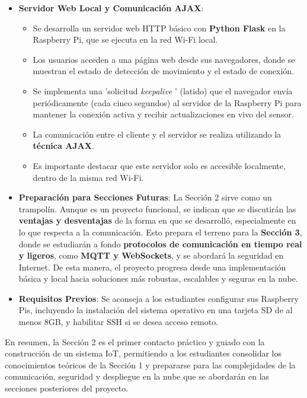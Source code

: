 \documentclass{report}
\begin{document}
\begin{itemize}
    \item \textbf{Servidor Web Local y Comunicación AJAX}:
    \begin{itemize}
        \item Se desarrolla un servidor web HTTP básico con \textbf{Python Flask} en la Raspberry Pi, que se ejecuta en la red Wi-Fi local.
        \item Los usuarios acceden a una página web desde sus navegadores, donde se muestran el estado de detección de movimiento y el estado de conexión.
        \item Se implementa una  'solicitud \textit{keepalive} ' (latido) que el navegador envía periódicamente (cada cinco segundos) al servidor 
        de la Raspberry Pi para mantener la conexión activa y recibir actualizaciones en vivo del sensor.
        \item La comunicación entre el cliente y el servidor se realiza utilizando la \textbf{técnica AJAX}.
        \item Es importante destacar que este servidor solo es accesible localmente, dentro de la misma red Wi-Fi.
    \end{itemize}

    \item \textbf{Preparación para Secciones Futuras}: La Sección 2 sirve como un trampolín. Aunque es un proyecto funcional, se  indican que se 
    discutirán las \textbf{ventajas y desventajas} de la forma en que se desarrolló, especialmente en lo que respecta a la comunicación. Esto prepara el 
    terreno para la \textbf{Sección 3}, donde se estudiarán a fondo \textbf{protocolos de comunicación en tiempo real y ligeros}, como \textbf{MQTT y 
    WebSockets}, y se abordará la seguridad en Internet. De esta manera, el proyecto progresa desde una implementación básica y local hacia soluciones 
    más robustas, escalables y seguras en la nube.
    
    \item \textbf{Requisitos Previos}: Se aconseja a los estudiantes configurar sus Raspberry Pis, incluyendo la instalación del sistema operativo en una 
    tarjeta SD de al menos 8GB, y habilitar SSH si se desea acceso remoto.
\end{itemize}
En resumen, la Sección 2 es el primer contacto práctico y guiado con la construcción de un sistema IoT, permitiendo a los estudiantes consolidar los 
conocimientos teóricos de la Sección 1 y prepararse para las complejidades de la comunicación, seguridad y despliegue en la nube que se abordarán en 
las secciones posteriores del proyecto.
\end{document}
